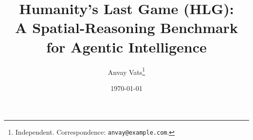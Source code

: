 \documentclass[11pt,letterpaper]{article}
\title{\textbf{Humanity's Last Game (HLG)}: \\
A Spatial-Reasoning Benchmark for Agentic Intelligence}
\author{Anvay Vats\thanks{Independent. Correspondence: \texttt{anvay@example.com}.}}
\date{\today}
\begin{document}
\maketitle

\begin{abstract}

\end{abstract}













\end{document}
